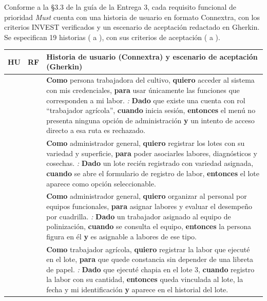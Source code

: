 Conforme a la §3.3 de la guía de la Entrega 3, cada requisito funcional de prioridad \emph{Must}
cuenta con una historia de usuario en formato Connextra, con los criterios INVEST verificados y un
escenario de aceptación redactado en Gherkin. Se especifican 19 historias ( a
), con sus criterios de aceptación ( a ).

\begin{longtable}{|C{1.3cm}|C{1.3cm}|L{12.4cm}|}
\hline
{}\textbf{HU} & \textbf{RF} & \textbf{Historia de usuario (Connextra) y escenario de aceptación (Gherkin)} \\
\hline
\endhead

 &  & \textbf{Como} persona trabajadora del cultivo, \textbf{quiero} acceder al sistema con mis credenciales, \textbf{para} usar únicamente las funciones que corresponden a mi labor. \newline \emph{:} \textbf{Dado} que existe una cuenta con rol ``trabajador agrícola'', \textbf{cuando} inicia sesión, \textbf{entonces} el menú no presenta ninguna opción de administración \textbf{y} un intento de acceso directo a esa ruta es rechazado. \\ \hline

 &  & \textbf{Como} administrador general, \textbf{quiero} registrar los lotes con su variedad y superficie, \textbf{para} poder asociarles labores, diagnósticos y cosechas. \newline \emph{:} \textbf{Dado} un lote recién registrado con variedad asignada, \textbf{cuando} se abre el formulario de registro de labor, \textbf{entonces} el lote aparece como opción seleccionable. \\ \hline

 &  & \textbf{Como} administrador general, \textbf{quiero} organizar al personal por equipos funcionales, \textbf{para} asignar labores y evaluar el desempeño por cuadrilla. \newline \emph{:} \textbf{Dado} un trabajador asignado al equipo de polinización, \textbf{cuando} se consulta el equipo, \textbf{entonces} la persona figura en él \textbf{y} es asignable a labores de ese tipo. \\ \hline

 &  & \textbf{Como} trabajador agrícola, \textbf{quiero} registrar la labor que ejecuté en el lote, \textbf{para} que quede constancia sin depender de una libreta de papel. \newline \emph{:} \textbf{Dado} que ejecuté chapia en el lote 3, \textbf{cuando} registro la labor con su cantidad, \textbf{entonces} queda vinculada al lote, la fecha y mi identificación \textbf{y} aparece en el historial del lote. \\ \hline


\end{longtable}
